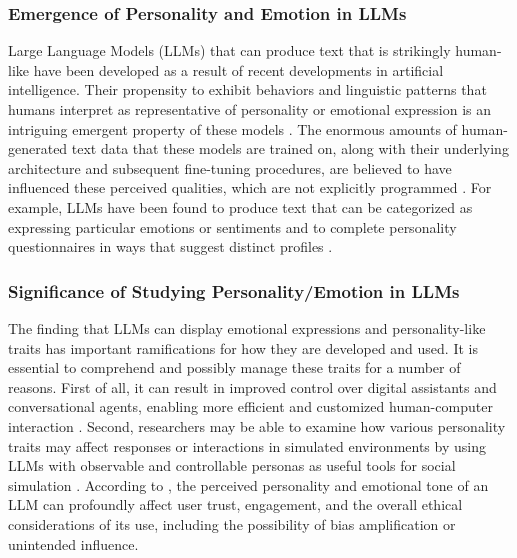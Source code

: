 \documentclass{DESSThesis}
\begin{document}
\subsubsection{Emergence of Personality and Emotion in LLMs}
Large Language Models (LLMs) that can produce text that is strikingly human-like have been developed as a result of recent developments in artificial intelligence. Their propensity to exhibit behaviors and linguistic patterns that humans interpret as representative of personality or emotional expression is an intriguing emergent property of these models \cite{jiang_evaluating_2023,pan_llms_2023,safdari_personality_2023,chang_modeling_2024}. The enormous amounts of human-generated text data that these models are trained on, along with their underlying architecture and subsequent fine-tuning procedures, are believed to have influenced these perceived qualities, which are not explicitly programmed \cite{frisch_llm_2024,gupta_self-assessment_2024,sorokovikova_llms_2024}. For example, LLMs have been found to produce text that can be categorized as expressing particular emotions or sentiments \cite{liu_emollms_2024,paech_eq-bench_2024} and to complete personality questionnaires in ways that suggest distinct profiles \cite{safdari_personality_2023,caron_identifying_2022}.

\subsubsection{Significance of Studying Personality/Emotion in LLMs}
The finding that LLMs can display emotional expressions and personality-like traits has important ramifications for how they are developed and used. It is essential to comprehend and possibly manage these traits for a number of reasons. First of all, it can result in improved control over digital assistants and conversational agents, enabling more efficient and customized human-computer interaction \cite{zhang_better_2024,mao_editing_2024}. Second, researchers may be able to examine how various personality traits may affect responses or interactions in simulated environments by using LLMs with observable and controllable personas as useful tools for social simulation \cite{song_identifying_2024,mozikov_good_2024}. According to \cite{safdari_personality_2023,chang_modeling_2024,sabour_emobench_2024}, the perceived personality and emotional tone of an LLM can profoundly affect user trust, engagement, and the overall ethical considerations of its use, including the possibility of bias amplification or unintended influence.
\end{document}
